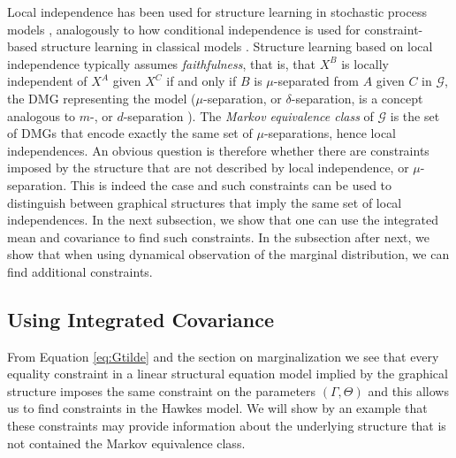 \documentclass[accepted]{uai2021} %
\begin{document}
Local independence has been used for structure learning in stochastic process 
models 
\citep{meek2014, mogensenUAI2018, thams2019, mogensenUAI2020}, analogously to 
how conditional independence is used for 
constraint-based structure learning in classical models \citep{spirtes1993, 
spirtesSearchChapHandbook}. Structure learning based on local independence 
typically assumes 
\emph{faithfulness}, that is, that $X^B$ is locally independent of $X^A$ given 
$X^C$ if and only if $B$ is $\mu$-separated from $A$ given $C$ in 
$\mathcal{G}$, the DMG 
representing the model
($\mu$-separation, or $\delta$-separation, is a concept analogous to $m$-, or 
$d$-separation \citep{didelez2000, didelez2008, mogensen2018}). The 
\emph{Markov equivalence class} of $\mathcal{G}$ is the set of DMGs that encode 
exactly the same set of $\mu$-separations, 
hence local independences. An obvious 
question is therefore whether there are constraints imposed by the 
 structure that are not described by local independence, or $\mu$-separation. 
 This is indeed the 
 case 
 and such constraints can be used to distinguish between graphical structures 
 that imply the same set of local independences. In the next subsection, we 
 show that one can use the integrated mean and covariance to find such 
 constraints. In the subsection after next, we show that when using
 dynamical observation of the marginal distribution, we can find additional 
 constraints.


\subsection{Using Integrated Covariance}

From Equation \ref{eq:Gtilde} and the section on marginalization we see that 
every equality 
constraint in a linear structural equation model implied by the graphical 
structure imposes the same constraint
on the parameters $(\Gamma, \Theta)$ and this allows us to find 
constraints 
in the Hawkes model. We will show by an example that these constraints may 
provide information about the underlying structure that is not contained the 
Markov equivalence class.
\end{document}
